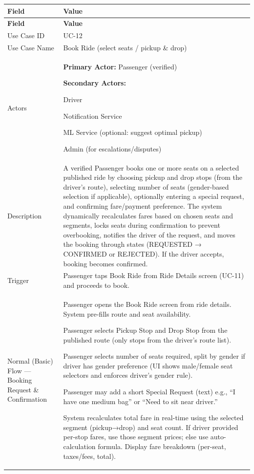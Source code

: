 \begin{longtable}{|p{3.5cm}|p{12cm}|}
\hline
\rowcolor{lightgray!30}
\textbf{Field} & \textbf{Value} \\
\hline
\endfirsthead
\hline
\rowcolor{lightgray!30}
\textbf{Field} & \textbf{Value} \\
\hline
\endhead
\hline
\endfoot
Use Case ID & UC-12 \\
\hline
Use Case Name & Book Ride (select seats / pickup \& drop) \\
\hline
Actors &
\textbf{Primary Actor:} Passenger (verified)

\textbf{Secondary Actors:}

Driver

Notification Service

ML Service (optional: suggest optimal pickup)

Admin (for escalations/disputes) \\
\hline
Description &
A verified Passenger books one or more seats on a selected published ride by choosing pickup and drop stops (from the driver’s route), selecting number of seats (gender-based selection if applicable), optionally entering a special request, and confirming fare/payment preference. The system dynamically recalculates fares based on chosen seats and segments, locks seats during confirmation to prevent overbooking, notifies the driver of the request, and moves the booking through states (REQUESTED → CONFIRMED or REJECTED). If the driver accepts, booking becomes confirmed. \\
\hline
Trigger &
Passenger taps Book Ride from Ride Details screen (UC-11) and proceeds to book. \\
\hline
Normal (Basic) Flow — Booking Request \& Confirmation &
Passenger opens the Book Ride screen from ride details. System pre-fills route and seat availability.

Passenger selects Pickup Stop and Drop Stop from the published route (only stops from the driver’s route list).

Passenger selects number of seats required, split by gender if driver has gender preference (UI shows male/female seat selectors and enforces driver’s gender rule).

Passenger may add a short Special Request (text) e.g., “I have one medium bag” or “Need to sit near driver.”

System recalculates total fare in real-time using the selected segment (pickup→drop) and seat count. If driver provided per-stop fares, use those segment prices; else use auto-calculation formula. Display fare breakdown (per-seat, taxes/fees, total).


\end{longtable}
